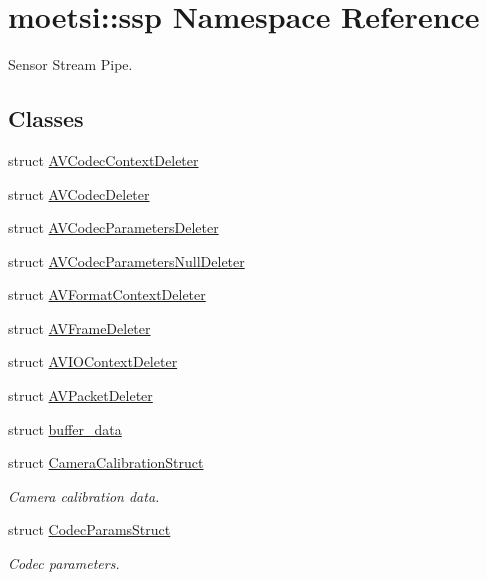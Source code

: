 \hypertarget{namespacemoetsi_1_1ssp}{}\section{moetsi\+:\+:ssp Namespace Reference}
\label{namespacemoetsi_1_1ssp}


Sensor Stream Pipe.  


\subsection*{Classes}
\begin{DoxyCompactItemize}
\item 
struct \hyperlink{structmoetsi_1_1ssp_1_1AVCodecContextDeleter}{A\+V\+Codec\+Context\+Deleter}
\item 
struct \hyperlink{structmoetsi_1_1ssp_1_1AVCodecDeleter}{A\+V\+Codec\+Deleter}
\item 
struct \hyperlink{structmoetsi_1_1ssp_1_1AVCodecParametersDeleter}{A\+V\+Codec\+Parameters\+Deleter}
\item 
struct \hyperlink{structmoetsi_1_1ssp_1_1AVCodecParametersNullDeleter}{A\+V\+Codec\+Parameters\+Null\+Deleter}
\item 
struct \hyperlink{structmoetsi_1_1ssp_1_1AVFormatContextDeleter}{A\+V\+Format\+Context\+Deleter}
\item 
struct \hyperlink{structmoetsi_1_1ssp_1_1AVFrameDeleter}{A\+V\+Frame\+Deleter}
\item 
struct \hyperlink{structmoetsi_1_1ssp_1_1AVIOContextDeleter}{A\+V\+I\+O\+Context\+Deleter}
\item 
struct \hyperlink{structmoetsi_1_1ssp_1_1AVPacketDeleter}{A\+V\+Packet\+Deleter}
\item 
struct \hyperlink{structmoetsi_1_1ssp_1_1buffer__data}{buffer\+\_\+data}
\item 
struct \hyperlink{structmoetsi_1_1ssp_1_1CameraCalibrationStruct}{Camera\+Calibration\+Struct}
\begin{DoxyCompactList}\small\item\em Camera calibration data. \end{DoxyCompactList}\item 
struct \hyperlink{structmoetsi_1_1ssp_1_1CodecParamsStruct}{Codec\+Params\+Struct}
\begin{DoxyCompactList}\small\item\em Codec parameters. \end{DoxyCompactList}\item 

\end{DoxyCompactItemize}
